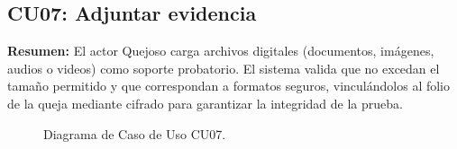 \begin{appendices}
\newpage

\subsection{CU07: Adjuntar evidencia}

\textbf{Resumen:} 
El actor Quejoso carga archivos digitales (documentos, imágenes, audios o videos) como soporte probatorio. El sistema valida que no excedan el tamaño permitido y que correspondan a formatos seguros, vinculándolos al folio de la queja mediante cifrado para garantizar la integridad de la prueba.

\begin{figure}[htbp]
    \centering
    \figCUsiete
    \caption{Diagrama de Caso de Uso CU07.}
    \label{fig:cu07}
\end{figure}


\end{appendices}
